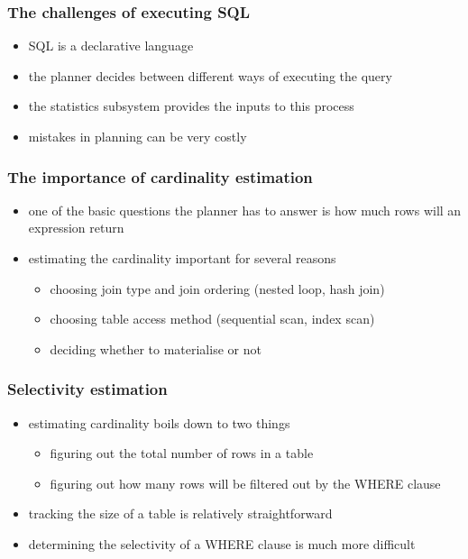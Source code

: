\documentclass{beamer}
\begin{document}
\begin{frame}
  \frametitle{The challenges of executing SQL}

  \begin{itemize}
  \item SQL is a \alert{declarative} language
  \item the planner decides between \alert{different ways} of executing the query
  \item the statistics subsystem provides the \alert{inputs} to this process
  \item mistakes in planning can be \alert{very costly}
  \end{itemize}
\end{frame}

\begin{frame}
  \frametitle{The importance of cardinality estimation}

  \begin{itemize}
    \item one of the basic questions the planner has to answer is \alert{how much rows will an expression return}
  \item estimating the cardinality important for several reasons
    \begin{itemize}
    \item choosing join \alert{type} and join \alert{ordering} (nested loop, hash join)
    \item choosing \alert{table access} method (sequential scan, index scan)
    \item deciding whether to \alert{materialise} or not
    \end{itemize}
  \end{itemize}
\end{frame}

\begin{frame}
  \frametitle{Selectivity estimation}
  \begin{itemize}
  \item estimating cardinality boils down to two things
    \begin{itemize}
    \item figuring out the \alert{total number of rows} in a table
    \item figuring out \alert{how many rows} will be \alert{filtered out} by the WHERE clause
    \end{itemize}
  \item tracking the size of a table is relatively \alert{straightforward}
  \item determining the \alert{selectivity} of a WHERE clause is \alert{much more difficult}
  \end{itemize}
\end{frame}
\end{document}
